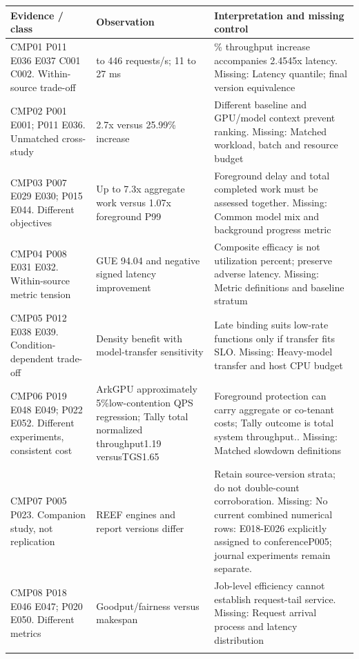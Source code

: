 \begin{longtable}{>{\raggedright\arraybackslash}p{}>{\raggedright\arraybackslash}p{}>{\raggedright\arraybackslash}p{}}
\toprule
\textbf{Evidence / class} & \textbf{Observation} & \textbf{Interpretation and missing control}\\\midrule\endhead
CMP01 P011 E036 E037 C001 C002. Within-source trade-off & 354 to 446 requests/s; 11 to 27 ms & 25.99\% throughput increase accompanies 2.4545x latency. Missing: Latency quantile; final version equivalence\\\addlinespace
CMP02 P001 E001; P011 E036. Unmatched cross-study & 2.7x versus 25.99\% increase & Different baseline and GPU/model context prevent ranking. Missing: Matched workload, batch and resource budget\\\addlinespace
CMP03 P007 E029 E030; P015 E044. Different objectives & Up to 7.3x aggregate work versus 1.07x foreground P99 & Foreground delay and total completed work must be assessed together. Missing: Common model mix and background progress metric\\\addlinespace
CMP04 P008 E031 E032. Within-source metric tension & GUE 94.04 and negative signed latency improvement & Composite efficacy is not utilization percent; preserve adverse latency. Missing: Metric definitions and baseline stratum\\\addlinespace
CMP05 P012 E038 E039. Condition-dependent trade-off & Density benefit with model-transfer sensitivity & Late binding suits low-rate functions only if transfer fits SLO. Missing: Heavy-model transfer and host CPU budget\\\addlinespace
CMP06 P019 E048 E049; P022 E052. Different experiments, consistent cost & ArkGPU approximately 5\%low-contention QPS regression; Tally total normalized throughput1.19 versusTGS1.65 & Foreground protection can carry aggregate or co-tenant costs; Tally outcome is total system throughput.. Missing: Matched slowdown definitions\\\addlinespace
CMP07 P005 P023. Companion study, not replication & REEF engines and report versions differ & Retain source-version strata; do not double-count corroboration. Missing: No current combined numerical rows: E018-E026 explicitly assigned to conferenceP005; journal experiments remain separate.\\\addlinespace
CMP08 P018 E046 E047; P020 E050. Different metrics & Goodput/fairness versus makespan & Job-level efficiency cannot establish request-tail service. Missing: Request arrival process and latency distribution\\\addlinespace

\end{longtable}
